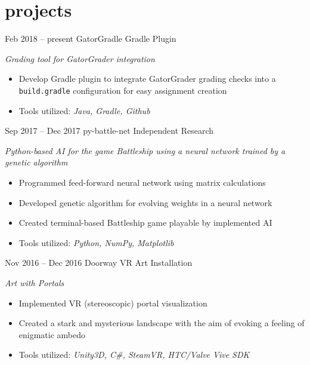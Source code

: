\documentclass[]{friggeri-cv}
\begin{document}
\section{projects}
\begin{entrylist}
  \entry
    {Feb 2018 -- present}
    {GatorGradle}
    {Gradle Plugin}
    {\emph{Grading tool for GatorGrader integration}
    \begin{itemize}[leftmargin=1.2em]
    \item Develop Gradle plugin to integrate GatorGrader grading checks into a \texttt{build.gradle} configuration for easy assignment creation
    \item Tools utilized: \emph{Java, Gradle, Github}
    \end{itemize}}
  \entry
    {Sep 2017 -- Dec 2017}
    {py-battle-net}
    {Independent Research}
    {\emph{Python-based AI for the game Battleship using a neural network trained by a genetic algorithm}
    \begin{itemize}[leftmargin=1.2em]
    \item Programmed feed-forward neural network using matrix calculations
    \item Developed genetic algorithm for evolving weights in a neural network
    \item Created terminal-based Battleship game playable by implemented AI
    \item Tools utilized: \emph{Python, NumPy, Matplotlib}
    \end{itemize}}
  \entry
    {Nov 2016 -- Dec 2016}
    {Doorway}
    {VR Art Installation}
    {\emph{Art with Portals}
    \begin{itemize}[leftmargin=1.2em]
    \item Implemented VR (stereoscopic) portal visualization
    \item Created a stark and mysterious landscape with the aim of evoking a feeling of enigmatic ambedo
    \item Tools utilized: \emph{Unity3D, C\#, SteamVR, HTC/Valve Vive SDK}
    \end{itemize}}
\end{entrylist}
\end{document}
